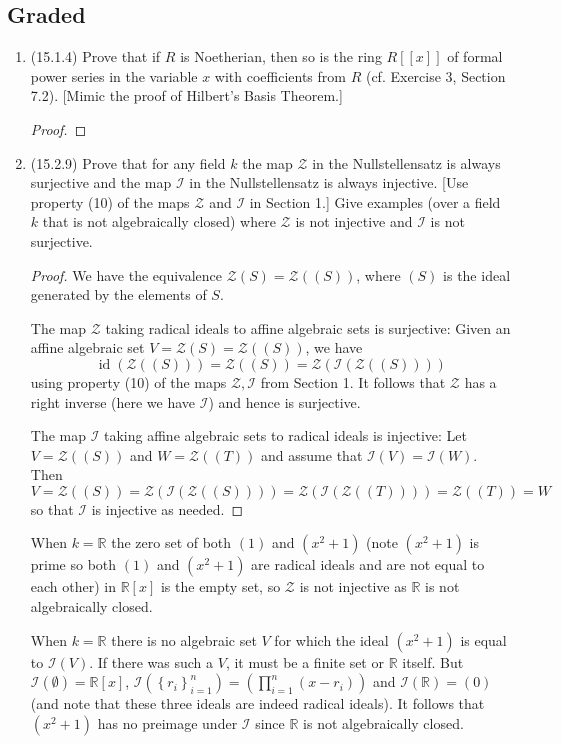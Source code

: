 \documentclass[11pt]{article}
\newcommand{\cbr}[1]{\left\{#1\right\}}
\DeclareMathOperator{\id}{id}
\begin{document}
\subsection*{Graded}
\begin{enumerate}
    \item (15.1.4) Prove that if $R$ is Noetherian, then so is the ring $R[[x]]$ of formal power series in the variable $x$ with coefficients from $R$ (cf. Exercise 3, Section 7.2). [Mimic the proof of Hilbert's Basis Theorem.] \begin{proof}
        
    \end{proof}
    \item (15.2.9) Prove that for any field $k$ the map $\mathcal{Z}$ in the Nullstellensatz is always surjective and the map $\mathcal{I}$ in the Nullstellensatz is always injective. [Use property (10) of the maps $\mathcal{Z}$ and $\mathcal{I}$ in Section 1.] Give examples (over a field $k$ that is not algebraically closed) where $\mathcal{Z}$ is not injective and $\mathcal{I}$ is not surjective. \begin{proof}
    We have the equivalence $\mathcal{Z}(S) = \mathcal{Z}((S))$, where $(S)$ is the ideal generated by the elements of $S$. 

    The map $\mathcal{Z}$ taking radical ideals to affine algebraic sets is surjective: Given an affine algebraic set $V = \mathcal{Z}(S) = \mathcal{Z}((S))$, we have \[\id(\mathcal{Z}((S)))= \mathcal{Z}((S)) = \mathcal{Z}(\mathcal{I}(\mathcal{Z}((S))))\] using property (10) of the maps $\mathcal{Z},\mathcal{I}$ from Section 1. It follows that $\mathcal{Z}$ has a right inverse (here we have $\mathcal{I}$) and hence is surjective.
    
    The map $\mathcal{I}$ taking affine algebraic sets to radical ideals is injective: Let $V = \mathcal{Z}((S))$ and $W = \mathcal{Z}((T))$ and assume that $\mathcal{I}(V) = \mathcal{I}(W)$. Then \[V = \mathcal{Z}((S)) = \mathcal{Z}(\mathcal{I}(\mathcal{Z}((S)))) = \mathcal{Z}(\mathcal{I}(\mathcal{Z}((T)))) = \mathcal{Z}((T)) = W\] so that $\mathcal{I}$ is injective as needed. 
    \end{proof}

    When $k=\mathbb{R}$ the zero set of both $(1)$ and $(x^2+1)$ (note $(x^2+1)$ is prime so both $(1)$ and $(x^2+1)$ are radical ideals and are not equal to each other) in $\mathbb{R}[x]$ is the empty set, so $\mathcal{Z}$ is not injective as $\mathbb{R}$ is not algebraically closed.

    When $k = \mathbb{R}$ there is no algebraic set $V$ for which the ideal $ (x^2+1)$ is equal to $\mathcal{I}(V)$. If there was such a $V$, it must be a finite set or $\mathbb{R}$ itself. But $\mathcal{I}(\emptyset) = \mathbb{R}[x]$, $\mathcal{I}(\cbr{r_i}_{i=1}^n) = (\prod_{i=1}^n (x-r_i))$ and $\mathcal{I}(\mathbb{R}) = (0)$ (and note that these three ideals are indeed radical ideals). It follows that $(x^2+1)$ has no preimage under $\mathcal{I}$ since $\mathbb{R}$ is not algebraically closed.
\end{enumerate}
\end{document}

